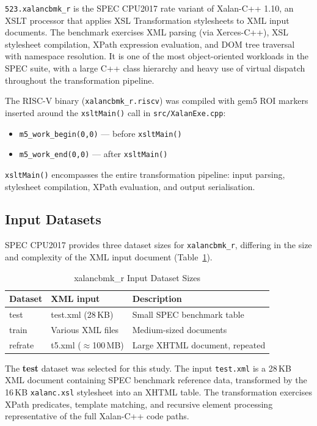\documentclass[conference]{IEEEtran}
\begin{document}
\texttt{523.xalancbmk\_r} is the SPEC CPU2017 rate variant of
Xalan-C++ 1.10, an XSLT processor that applies XSL Transformation
stylesheets to XML input documents. The benchmark exercises XML
parsing (via Xerces-C++), XSL stylesheet compilation, XPath expression
evaluation, and DOM tree traversal with namespace resolution. It is
one of the most object-oriented workloads in the SPEC suite, with a
large C++ class hierarchy and heavy use of virtual dispatch throughout
the transformation pipeline.

The RISC-V binary (\texttt{xalancbmk\_r.riscv}) was compiled with gem5
ROI markers inserted around the \texttt{xsltMain()} call in
\texttt{src/XalanExe.cpp}:

\begin{itemize}
    \item \texttt{m5\_work\_begin(0,0)} --- before \texttt{xsltMain()}
    \item \texttt{m5\_work\_end(0,0)}   --- after  \texttt{xsltMain()}
\end{itemize}

\texttt{xsltMain()} encompasses the entire transformation pipeline:
input parsing, stylesheet compilation, XPath evaluation, and output
serialisation.

\subsection{Input Datasets}

SPEC CPU2017 provides three dataset sizes for \texttt{xalancbmk\_r},
differing in the size and complexity of the XML input document
(Table~\ref{tab:inputs}).

\begin{table}[H]
\centering
\caption{xalancbmk\_r Input Dataset Sizes}
\label{tab:inputs}
\begin{tabular}{lll}
\toprule
\textbf{Dataset} & \textbf{XML input} & \textbf{Description} \\
\midrule
test    & test.xml (28\,KB)   & Small SPEC benchmark table \\
train   & Various XML files   & Medium-sized documents \\
refrate & t5.xml ($\approx$100\,MB) & Large XHTML document, repeated \\
\bottomrule
\end{tabular}
\end{table}

The \textbf{test} dataset was selected for this study. The input
\texttt{test.xml} is a 28\,KB XML document containing SPEC benchmark
reference data, transformed by the 16\,KB \texttt{xalanc.xsl}
stylesheet into an XHTML table. The transformation exercises XPath
predicates, template matching, and recursive element processing
representative of the full Xalan-C++ code paths.
\end{document}
